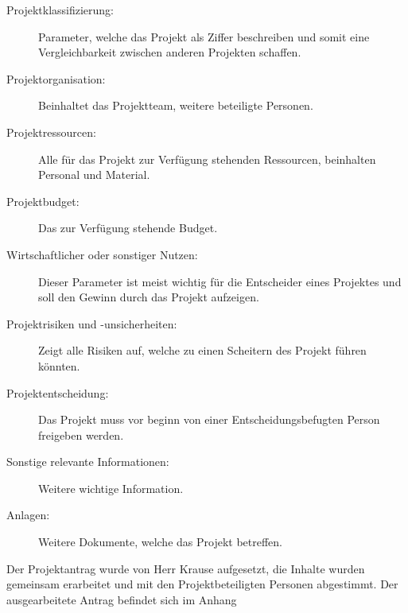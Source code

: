 \begin{description}
\item[Projektklassifizierung:] Parameter, welche das Projekt als Ziffer beschreiben und somit eine Vergleichbarkeit zwischen anderen Projekten schaffen.
\item[Projektorganisation:] Beinhaltet das Projektteam, weitere beteiligte Personen.
\item[Projektressourcen:] Alle für das Projekt zur Verfügung stehenden Ressourcen, beinhalten Personal und Material.
\item[Projektbudget:] Das zur Verfügung stehende Budget.
\item[Wirtschaftlicher oder sonstiger Nutzen:] Dieser Parameter ist meist wichtig für die Entscheider eines Projektes und soll den Gewinn durch das Projekt aufzeigen.
\item[Projektrisiken und -unsicherheiten:] Zeigt alle Risiken auf, welche zu einen Scheitern des Projekt führen könnten.
\item[Projektentscheidung:] Das Projekt muss vor beginn von einer Entscheidungsbefugten Person freigeben werden.
\item[Sonstige relevante Informationen:] Weitere wichtige Information.
\item[Anlagen:] Weitere Dokumente, welche das Projekt betreffen.
\end{description}

Der Projektantrag wurde von Herr Krause aufgesetzt, die Inhalte wurden gemeinsam erarbeitet und mit den Projektbeteiligten Personen abgestimmt. Der ausgearbeitete Antrag befindet sich im Anhang
